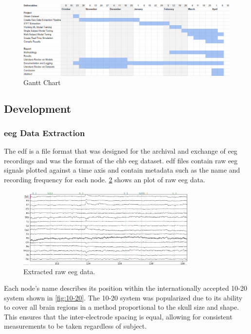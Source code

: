 \documentclass[12pt]{article}
\begin{document}
\begin{figure}[H]
\includegraphics[width=\textwidth]{gantt}
\centering
\caption{Gantt Chart}
\label{fig:gantt}
\end{figure}




\subsection{Development}


\subsubsection{\acrfull{eeg} Data Extraction}

The \acrfull{edf} \cite{kemp1992simple} is a file format that was designed for the archival and exchange of \acrshort{eeg} recordings \cite{kemp2013european} and was the format of the \acrshort{chb} \acrshort{eeg} dataset. \acrshort{edf} files contain raw \acrshort{eeg} signals plotted against a time axis and contain metadata such as the name and recording frequency for each node. \ref{fig:eegPlot} shows an plot of raw \acrshort{eeg} data.

\begin{figure}[H]
\includegraphics[width=0.8\textwidth]{eeg_raw_continuous}
\centering
\caption{Extracted raw \acrshort{eeg} data. \protect\cite{neuraldatascience2024}}
\label{fig:eegPlot}
\end{figure}

Each node's name describes its position within the internationally accepted 10-20 system shown in \ref{fig:10-20}. The 10-20 system was popularized due to its ability to cover all brain regions in a method proportional to the skull size and shape. This ensures that the inter-electrode spacing is equal, allowing for consistent measurements to be taken regardless of subject. \cite{morley201610}
\end{document}
